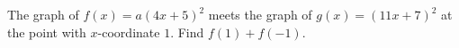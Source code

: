 The graph of $f(x)=a(4x+5)^2$ meets the graph of $g(x)=(11x+7)^2$ at the point with $x$-coordinate $1$. Find $f(1)+f(-1)$.
